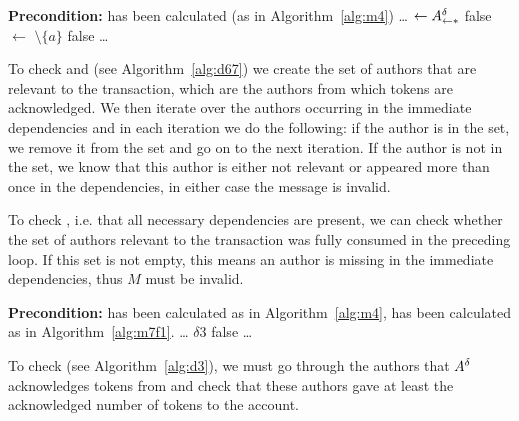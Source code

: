 \begin{algorithm}[ht]
    \caption{Code snippet verifying  and }
    \label{alg:d67}
\begin{algorithmic}
    \Statex \textbf{Precondition:}  has been calculated (as in Algorithm~\ref{alg:m4})
    \Statex \ldots \vphantom{I}
    \State {} $\gets A^\delta_{\leftarrow*}$
     \Comment {}
            \State \Return false
        \EndIf
        \State {} $\gets$  $\setminus \{a\}$
    \EndFor
     \Comment {}
        \State \Return false
    \EndIf
    \Statex \ldots \vphantom{I}
\end{algorithmic}
\end{algorithm}
To check  and  (see Algorithm~\ref{alg:d67}) we create the set of authors  that are relevant to the transaction, which are the authors from which tokens are acknowledged. We then iterate over the authors occurring in the immediate dependencies and in each iteration we do the following: if the author is in the set, we remove it from the set and go on to the next iteration. If the author is not in the set, we know that this author is either not relevant or appeared more than once in the dependencies, in either case the message is invalid.

To check , i.e. that all necessary dependencies are present, we can check whether the set of authors relevant to the transaction was fully consumed in the preceding loop. If this set is not empty, this means an author is missing in the immediate dependencies, thus $M$ must be invalid.
\\

\begin{algorithm}[ht]
    \caption{Code snippet verifying }
    \label{alg:d3}
\begin{algorithmic}
    \Statex \textbf{Precondition:}  has been calculated as in Algorithm~\ref{alg:m4},  has been calculated as in Algorithm~\ref{alg:m7f1}.
    \Statex \ldots \vphantom{I}
     \Comment $\delta3$
            \State \Return false
        \EndIf
    \EndFor
    \Statex \ldots \vphantom{I}
\end{algorithmic}
\end{algorithm}
To check  (see Algorithm~\ref{alg:d3}), we must go through the authors that $A^\delta$ acknowledges tokens from and check that these authors gave at least the acknowledged number of tokens to the account.



